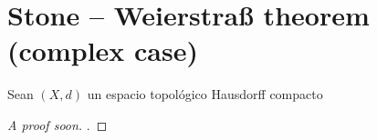 \section{Stone – Weierstraß theorem (complex case)}

\begin{frame}

	\begin{theorem}[\secname]
		Sean $\left(X, d\right)$ un espacio topológico Hausdorff compacto
	\end{theorem}

	\begin{proof}[\alert{A proof soon}]
		.
	\end{proof}
\end{frame}